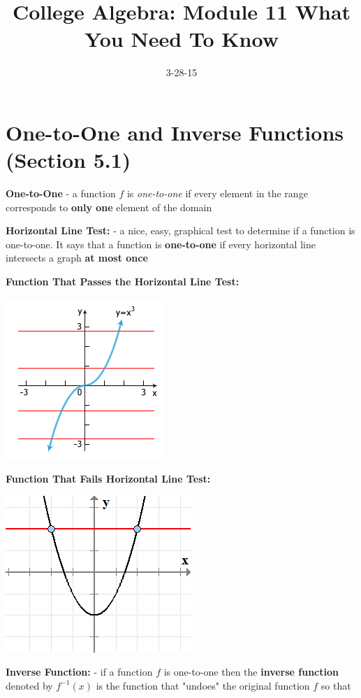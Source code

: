 \documentclass[12pt]{article}
\begin{document}
\title{College Algebra: Module 11 What You Need To Know}
\date{3-28-15}
\author{}
\maketitle

\section{One-to-One and Inverse Functions (Section 5.1)}

\textbf{One-to-One} - a function $f$ is \textit{one-to-one} if every element in the range corresponds to \textbf{only one} element of the domain

\textbf{Horizontal Line Test:} - a nice, easy, graphical test to determine if a function is one-to-one. It says that a function is \textbf{one-to-one} if every horizontal line intersects a graph \textbf{at most once}


\textbf{Function That Passes the Horizontal Line Test:}

\centerline{\includegraphics{PassHLT.jpg}}

\textbf{Function That Fails Horizontal Line Test:}

\centerline{\includegraphics{FailHLT.png}}

\newpage

\textbf{Inverse Function:} - if a function $f$ is one-to-one then the \textbf{inverse function} denoted by $f^{-1}(x)$ is the function that "undoes" the original function $f$ so that
\newline
\end{document}

